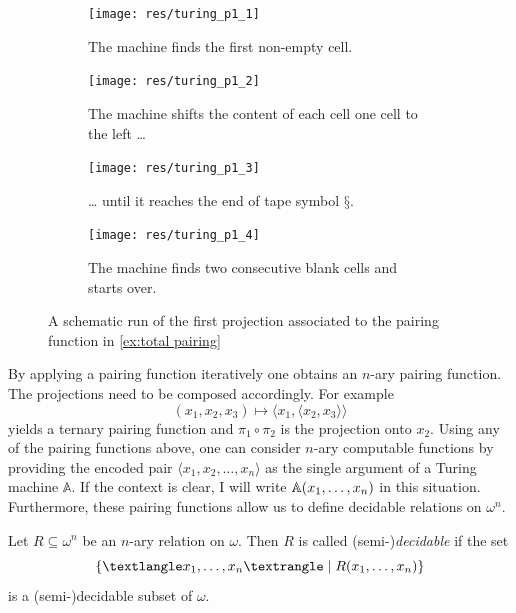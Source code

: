\begin{figure}
    \begin{subfigure}{.5\textwidth}
        \texttt{[image: res/turing\_p1\_1]}
        \caption{The machine finds the first non-empty cell.}
        \label{fig:total pairing non empty}
    \end{subfigure}

    \begin{subfigure}{.5\textwidth}
        \texttt{[image: res/turing\_p1\_2]}
        \caption{The machine shifts the content of each cell one cell to the left …}
        \label{fig:total pairing shift left 1}
    \end{subfigure}

    \begin{subfigure}{.5\textwidth}
        \texttt{[image: res/turing\_p1\_3]}
        \caption{… until it reaches the end of tape symbol \(§\).}
        \label{fig:total pairing shift left 2}
    \end{subfigure}

    \begin{subfigure}{.5\textwidth}
        \texttt{[image: res/turing\_p1\_4]}
        \caption{The machine finds two consecutive blank cells and starts over.}
        \label{fig:total pairing double blank}
    \end{subfigure}

    \caption{A schematic run of the first projection associated to the pairing function in \cref{ex:total pairing}}
    \label{fig:pairing function}
\end{figure}

By applying a pairing function iteratively one obtains an $n$-ary pairing
function. The projections need to be composed accordingly. For example
\[
  (x_1, x_2, x_3) ↦ ⟨x_1, ⟨x_2, x_3⟩⟩
\]
yields a ternary pairing function and $π_1\circ π_2$ is the projection onto
$x_2$. Using any of the pairing functions above, one can consider $n$-ary
computable functions by providing the encoded pair $⟨x_1, x_2, …, x_n⟩$ as the
single argument of a Turing machine $\mathbb A$. If the context is clear, I will
write $\mathbb A(x_{1},\ldots,x_{n})$ in this situation. Furthermore, these pairing
functions allow us to define decidable relations on \(ω^n\).

\begin{defin}
  Let \(R \subseteq ω^n\) be an \(n\)-ary relation on \(ω\). Then \(R\) is
  called (semi-)\emph{decidable} if the set
  \[
    \set{⟨\seq{x}⟩ \mid R(\seq{x})}
  \]
  is a (semi-)decidable subset of \(ω\).
\end{defin}


